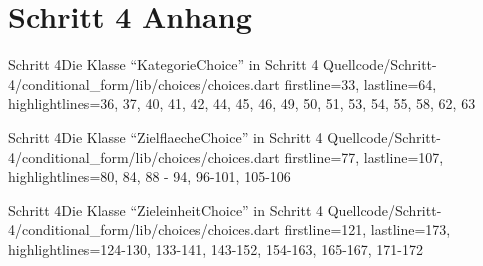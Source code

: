 \chapter{Schritt 4 Anhang} 
\label{appendix:Schritt4Anhang}

\begin{alexlisting}{Schritt 4}{Die Klasse \enquote{KategorieChoice} in Schritt 4}
    {Quellcode/Schritt-4/conditional_form/lib/choices/choices.dart}
    {firstline=33, lastline=64, highlightlines={36, 37, 40, 41, 42, 44, 45, 46, 49, 50, 51, 53, 54, 55, 58, 62, 63}}
    \label{lst:Schritt4KategorieChoice}
  \end{alexlisting}

  \begin{alexlisting}{Schritt 4}{Die Klasse \enquote{ZielflaecheChoice} in Schritt 4}
    {Quellcode/Schritt-4/conditional_form/lib/choices/choices.dart}
    {firstline=77, lastline=107, highlightlines={80, 84, 88 - 94, 96-101, 105-106 }}
    \label{lst:Schritt4ZielflaecheChoice}
  \end{alexlisting}


  \begin{alexlisting}{Schritt 4}{Die Klasse \enquote{ZieleinheitChoice} in Schritt 4}
    {Quellcode/Schritt-4/conditional_form/lib/choices/choices.dart}
    {firstline=121, lastline=173, highlightlines={124-130, 133-141, 143-152, 154-163, 165-167, 171-172 }}
    \label{lst:Schritt4ZieleinheitChoice}
  \end{alexlisting}